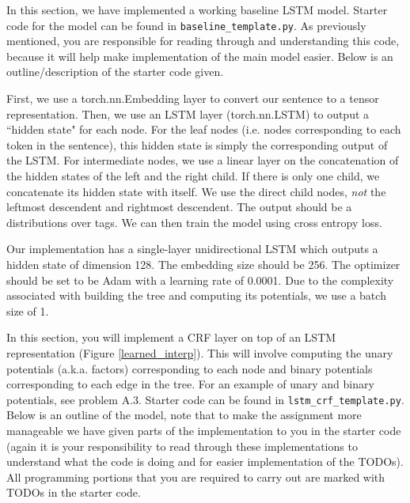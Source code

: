 \documentclass[11pt,addpoints,answers]{exam}
\numberwithin{equation}{section} %
\numberwithin{figure}{section} %
\numberwithin{table}{section} %
\begin{document}
In this section, we have implemented a working baseline LSTM model. Starter code for the model can be found in \verb|baseline_template.py|. As previously mentioned, you are responsible for reading through and understanding this code, because it will help make implementation of the main model easier. Below is an outline/description of the starter code given.

First, we use a torch.nn.Embedding layer to convert our sentence to a tensor representation. Then, we use an LSTM layer (torch.nn.LSTM) to output a ``hidden state" for each node. For the leaf nodes (i.e. nodes corresponding to each token in the sentence), this hidden state is simply the corresponding output of the LSTM. For intermediate nodes, we use a linear layer on the concatenation of the hidden states of the left and the right child. {\color{red} If there is only one child, we concatenate its hidden state with itself.} We use the direct child nodes, \textit{not} the leftmost descendent and rightmost descendent. The output should be a distributions over tags. We can then train the model using cross entropy loss.

Our implementation has a single-layer unidirectional LSTM which outputs a hidden state of dimension 128. The embedding size should be 256. The optimizer should be set to be Adam with a learning rate of 0.0001. Due to the complexity associated with building the tree and computing its potentials, we use a batch size of 1.
 

In this section, you will implement a CRF layer on top of an LSTM representation (Figure \ref{learned_interp}). This will involve computing the unary potentials (a.k.a. factors) corresponding to each node and binary potentials corresponding to each edge in the tree. For an example of unary and binary potentials, see problem A.3. Starter code can be found in \verb|lstm_crf_template.py|. Below is an outline of the model, note that to make the assignment more manageable we have given parts of the implementation to you in the starter code (again it is your responsibility to read through these implementations to understand what the code is doing and for easier implementation of the TODOs). All programming portions that you are required to carry out are marked with TODOs in the starter code.
\end{document}
